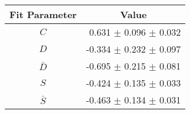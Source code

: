 \begin{tabular}{c r } 
\hline
\hline
Fit Parameter & \multicolumn{1}{c}{Value}  \\ 
\hline
$C$ & 0.631 $\pm$ 0.096 $\pm$ 0.032 \\ 
$D$ & -0.334 $\pm$ 0.232 $\pm$ 0.097 \\ 
$\bar{D}$ & -0.695 $\pm$ 0.215 $\pm$ 0.081 \\ 
$S$ & -0.424 $\pm$ 0.135 $\pm$ 0.033 \\ 
$\bar{S}$ & -0.463 $\pm$ 0.134 $\pm$ 0.031 \\ 
\hline
\hline
\end{tabular}
